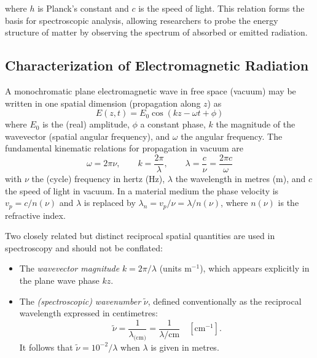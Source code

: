 \noindent where $h$ is Planck's constant and $c$ is the speed of light. This relation forms the basis for spectroscopic analysis, allowing researchers to probe the energy structure of matter by observing the spectrum of absorbed or emitted radiation.


\subsection{Characterization of Electromagnetic Radiation}
\label{subsec:em_radiation_characterization}

\noindent A monochromatic plane electromagnetic wave in free space (vacuum) may be written in one spatial dimension (propagation along $z$) as
\begin{equation}
    E(z,t) = E_0 \cos(k z - \omega t + \phi)
    \label{eq:plane_wave}
\end{equation}
where $E_0$ is the (real) amplitude, $\phi$ a constant phase, $k$ the magnitude of the wavevector (spatial angular frequency), and $\omega$ the angular frequency. The fundamental kinematic relations for propagation in vacuum are
\begin{equation}
    \omega = 2\pi\nu, \qquad k = \frac{2\pi}{\lambda}, \qquad \lambda = \frac{c}{\nu} = \frac{2\pi c}{\omega}
    \label{eq:wavelength_frequency_relation}
\end{equation}
with $\nu$ the (cycle) frequency in hertz (Hz), $\lambda$ the wavelength in metres (m), and $c$ the speed of light in vacuum. In a material medium the phase velocity is $v_p = c/n(\nu)$ and $\lambda$ is replaced by $\lambda_n = v_p/\nu = \lambda/n(\nu)$, where $n(\nu)$ is the refractive index.

\noindent Two closely related but distinct reciprocal spatial quantities are used in spectroscopy and should not be conflated:
\begin{itemize}
    \item The \emph{wavevector magnitude} $k = 2\pi/\lambda$ (units m$^{-1}$), which appears explicitly in the plane wave phase $kz$.
    \item The \emph{(spectroscopic) wavenumber} $\tilde{\nu}$, defined conventionally as the reciprocal wavelength expressed in centimetres:
          \begin{equation}
              \tilde{\nu} = \frac{1}{\lambda_{\text{(cm)}}} = \frac{1}{\lambda / \mathrm{cm}} \quad [\mathrm{cm}^{-1}].
              \label{eq:wavenumber_definition}
          \end{equation}
          It follows that $\tilde{\nu} = 10^{-2} / \lambda$ when $\lambda$ is given in metres.
\end{itemize}

